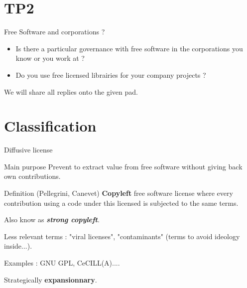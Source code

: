 \documentclass{beamer}
\begin{document}
\section{TP2}

\begin{frame}{Free Software and corporations ?}

  \begin{itemize}
  \item Is there a particular governance with free software in the corporations you know or you work at ?
  \item Do you use free licensed librairies for your company projects ? 
  \end{itemize}

We will share all replies onto the given pad.  
\end{frame}


\section{Classification}

\begin{frame}{Diffusive license}

  \begin{block}{Main purpose}
    Prevent to extract value from free software without giving back own contributions.
  \end{block}

  \begin{alertblock}{Definition (Pellegrini, Canevet)}
    \textbf{Copyleft} free software license where every contribution using a code under this licensed is subjected to the same terms.
   \end{alertblock}

Also know as \textit{\textbf{strong copyleft}}.

Less relevant terms : "viral licenses", "contaminants" (terms to avoid  ideology inside...).
  
Examples : GNU GPL, CeCILL(A)....

Strategically \textbf{expansionnary}.
\end{frame}

\end{document}
